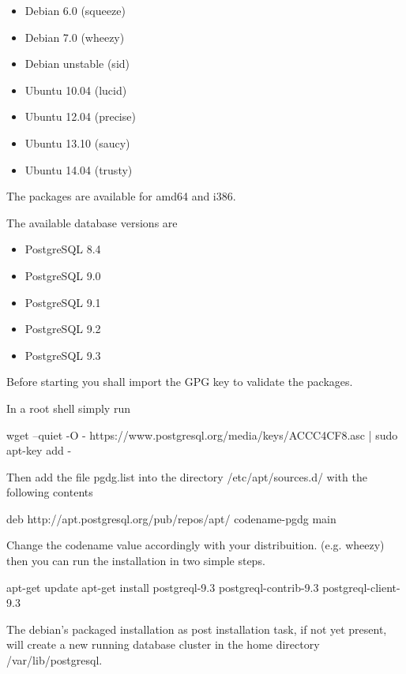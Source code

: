\begin{itemize}
 \item Debian 6.0 (squeeze)
 \item Debian 7.0 (wheezy)
 \item Debian unstable (sid) 
 \item Ubuntu 10.04 (lucid)
 \item Ubuntu 12.04 (precise)
 \item Ubuntu 13.10 (saucy)
 \item Ubuntu 14.04 (trusty) 
\end{itemize}
The packages are available for amd64 and i386.

The available database versions are
\begin{itemize}
 \item PostgreSQL 8.4 
 \item PostgreSQL 9.0 
 \item PostgreSQL 9.1 
 \item PostgreSQL 9.2 
 \item PostgreSQL 9.3
\end{itemize}

Before starting you shall import the GPG key to validate the packages.

In a root shell simply run
\begin{smallverbatim}
wget --quiet -O - https://www.postgresql.org/media/keys/ACCC4CF8.asc | sudo apt-key add -
\end{smallverbatim}
Then add the file pgdg.list into the directory /etc/apt/sources.d/ with the following contents

\begin{smallverbatim}
deb http://apt.postgresql.org/pub/repos/apt/ {codename}-pgdg main
\end{smallverbatim}

Change the codename value accordingly with your distribuition. (e.g. wheezy) then you can run the 
installation in two simple steps.

\begin{smallverbatim}
apt-get update
apt-get install postgreql-9.3 postgreql-contrib-9.3 postgreql-client-9.3 
\end{smallverbatim}
The debian's packaged installation as post installation task, if not yet present, will create a
new running database cluster in the home directory /var/lib/postgresql.

